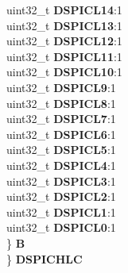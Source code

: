 \begin{DoxyCompactItemize}
\begin{tabbing}
\>\>uint32\_t {\bfseries DSPICL14}:1\\
\>\>uint32\_t {\bfseries DSPICL13}:1\\
\>\>uint32\_t {\bfseries DSPICL12}:1\\
\>\>uint32\_t {\bfseries DSPICL11}:1\\
\>\>uint32\_t {\bfseries DSPICL10}:1\\
\>\>uint32\_t {\bfseries DSPICL9}:1\\
\>\>uint32\_t {\bfseries DSPICL8}:1\\
\>\>uint32\_t {\bfseries DSPICL7}:1\\
\>\>uint32\_t {\bfseries DSPICL6}:1\\
\>\>uint32\_t {\bfseries DSPICL5}:1\\
\>\>uint32\_t {\bfseries DSPICL4}:1\\
\>\>uint32\_t {\bfseries DSPICL3}:1\\
\>\>uint32\_t {\bfseries DSPICL2}:1\\
\>\>uint32\_t {\bfseries DSPICL1}:1\\
\>\>uint32\_t {\bfseries DSPICL0}:1\\
\>\} {\bfseries B}\\
\} {\bfseries DSPICHLC}\\


\end{tabbing}
\end{DoxyCompactItemize}
